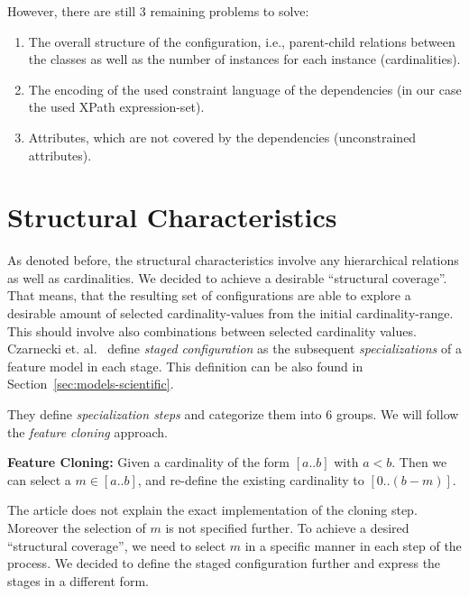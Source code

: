 However, there are still 3 remaining problems to solve:
\begin{enumerate}
 \item The overall structure of the configuration, i.e., parent-child relations between the classes as well as the number of instances for each instance (cardinalities).
 \item The encoding of the used constraint language of the dependencies (in our case the used XPath expression-set).
 \item Attributes, which are not covered by the dependencies (unconstrained attributes).
\end{enumerate}



\section{Structural Characteristics}\label{sec:structure-fm}

As denoted before, the structural characteristics involve any hierarchical relations as well as cardinalities. We decided to achieve a desirable ``structural coverage''. That means, that the resulting set of configurations are able to explore a desirable amount of selected cardinality-values from the initial cardinality-range. This should involve also combinations between selected cardinality values.\\

Czarnecki et. al.~\cite{card-based-feature-models-formalization} define \emph{staged configuration} as the subsequent \emph{specializations} of a feature model in each stage. This definition can be also found in Section~\ref{sec:models-scientific}. 

They define \emph{specialization steps} and categorize them into 6 groups. We will follow the \emph{feature cloning} approach. 

\begin{definition}{\textbf{Feature Cloning:}}
Given a cardinality of the form $[a..b]$ with $a < b$. Then we can select a $m \in [a..b]$, and re-define the existing cardinality to $[0..(b-m)]$. 
\end{definition}

The article does not explain the exact implementation of the cloning step. Moreover the selection of $m$ is not specified further. To achieve a desired ``structural coverage'', we need to select $m$ in a specific manner in each step of the process. We decided to define the staged configuration further and express the stages in a different form. 

